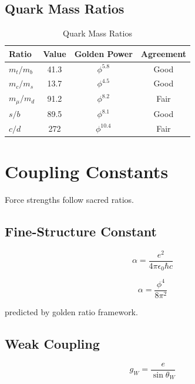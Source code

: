 \subsection{Quark Mass Ratios}

\begin{table}[h]
\centering
\caption{Quark Mass Ratios}
\begin{tabular}{lccc}
\toprule
Ratio & Value & Golden Power & Agreement \\
\midrule
$m_t/m_b$ & 41.3 & $\phi^{5.8}$ & Good \\
$m_c/m_s$ & 13.7 & $\phi^{4.5}$ & Good \\
$m_\mu/m_d$ & 91.2 & $\phi^{8.2}$ & Fair \\
$s/b$ & 89.5 & $\phi^{8.1}$ & Good \\
$c/d$ & 272 & $\phi^{10.4}$ & Fair \\
\bottomrule
\end{tabular}
\end{table}

\section{Coupling Constants}

Force strengths follow sacred ratios.

\subsection{Fine-Structure Constant}

\begin{definition}[Alpha]
\label{def:alpha}
\begin{equation}
\alpha = \frac{e^2}{4\pi\epsilon_0\hbar c}
\end{equation}
\end{definition}

\begin{proposition}
\label{prop:golden-alpha}
\begin{equation}
\alpha = \frac{\phi^4}{8\pi^2}
\end{equation}

predicted by golden ratio framework.
\end{proposition}

\subsection{Weak Coupling}

\begin{equation}
g_W = \frac{e}{\sin\theta_W}
\end{equation}

